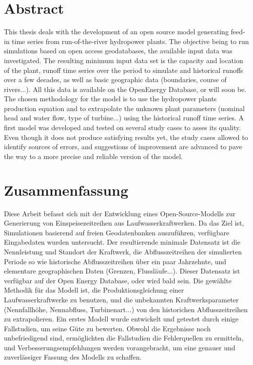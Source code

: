 \chapter*{Abstract}
\label{chap:abstract}

This thesis deals with the development of an open source model generating feed-in time series from run-of-the-river hydropower plants. The objective being to run simulations based on open access geodatabases, the available input data was investigated. The resulting minimum input data set is the capacity and location of the plant, runoff time series over the period to simulate and historical runoffs over a few decades, as well as basic geographic data (boundaries, course of rivers...). All this data is available on the OpenEnergy Database, or will soon be. The chosen methodology for the model is to use the hydropower plants production equation and to extrapolate the unknown plant parameters (nominal head and water flow, type of turbine...) using the historical runoff time series. A first model was developed and tested on several study cases to asses its quality. Even though it does not produce satisfying results yet, the study cases allowed to identify sources of errors, and suggestions of improvement are advanced to pave the way to a more precise and reliable version of the model.


{\let\clearpage\relax\chapter*{Zusammenfassung}}

Diese Arbeit befasst sich mit der Entwicklung eines Open-Source-Modells zur Generierung von Einspeisezeitreihen aus Laufwasserkraftwerken. Da das Ziel ist, Simulationen basierend auf freien Geodatenbanken auszuführen, verfügbare Eingabedaten wurden untersucht. Der resultierende minimale Datensatz ist die Nennleistung und Standort der Kraftwerk, die Abflusszeitreihen der simulierten Periode so wie historische Abflusszeitreihen über ein paar Jahrzehnte, und elementare geographischen Daten (Grenzen, Flussläufe...). Dieser Datensatz ist verfügbar auf der Open Energy Database, oder wird bald sein. Die gewählte Methodik für das Modell ist, die Produktionsgleichung einer Laufwasserkraftwerke zu benutzen, und die unbekannten Kraftwerksparameter (Nennfallhöhe, Nennabfluss, Turbinenart...) von den historichen Abflusszeitreihen zu extrapolieren. Ein erstes Modell wurde entwickelt und getestet durch einige Fallstudien, um seine Güte zu bewerten. Obwohl die Ergebnisse noch unbefriedigend sind, ermöglichten die Fallstudien die Fehlerquellen zu ermitteln, und Verbesserungsempfehlungen werden vorangebracht, um eine genauer und zuverlässiger Fassung des Modells zu schaffen.

